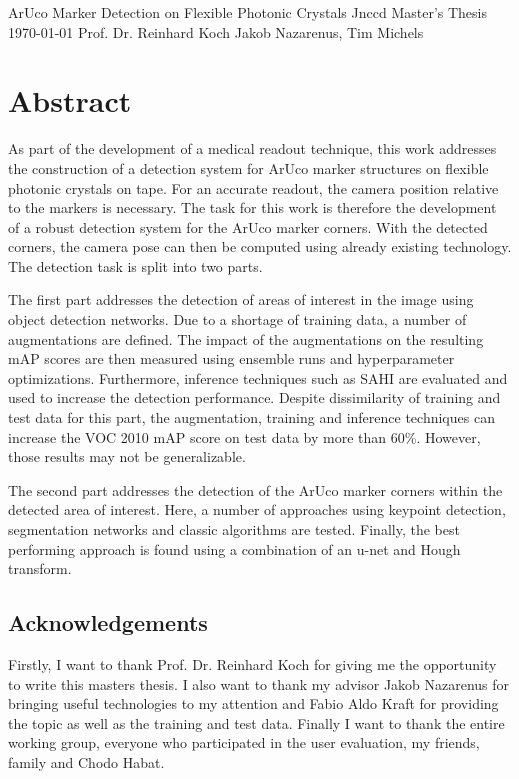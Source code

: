 \documentclass[10pt]{book}
\newcommand*\NewPage{\newpage\null\thispagestyle{empty}\newpage}
\begin{document}
\frontmatter

\studtitlepage%
{ArUco Marker Detection on Flexible Photonic Crystals}%
{}
{Jnccd}%
{Master's Thesis}%
{\today}%
{Prof. Dr. Reinhard Koch}%
{Jakob Nazarenus, Tim Michels}%
\NewPage{}
\setcounter{page}{2}
\studeidesstatt
\NewPage{}

\setcounter{page}{3}
\chapter*{Abstract}

As part of the development of a medical readout technique, this work addresses the construction of a detection system for \ac{ArUco} marker structures on flexible photonic crystals on tape. For an accurate readout, the camera position relative to the markers is necessary. The task for this work is therefore the development of a robust detection system for the \ac{ArUco} marker corners. With the detected corners, the camera pose can then be computed using already existing technology. The detection task is split into two parts. 

The first part addresses the detection of areas of interest in the image using object detection networks. Due to a shortage of training data, a number of augmentations are defined. 
The impact of the augmentations on the resulting \ac{mAP} scores are then measured using ensemble runs and hyperparameter optimizations. Furthermore, inference techniques such as \ac{SAHI} are evaluated and used to increase the detection performance. Despite dissimilarity of training and test data for this part, the augmentation, training and inference techniques can increase the VOC 2010 \ac{mAP} score on test data by more than 60\%. However, those results may not be generalizable.

The second part addresses the detection of the \ac{ArUco} marker corners within the detected area of interest. Here, a number of approaches using keypoint detection, segmentation networks and classic algorithms are tested. Finally, the best performing approach is found using a combination of an u-net and Hough transform.

\newpage
\section*{Acknowledgements}
Firstly, I want to thank Prof. Dr. Reinhard Koch for giving me the opportunity to write this masters thesis. I also want to thank my advisor Jakob Nazarenus for bringing useful technologies to my attention and Fabio Aldo Kraft for providing the topic as well as the training and test data. Finally I want to thank the entire working group, everyone who participated in the user evaluation, my friends, family and Chodo Habat.
\end{document}
